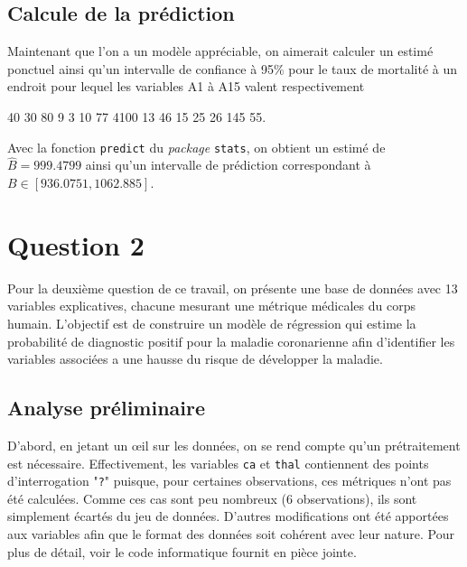 \documentclass{article}
\begin{document}
	\subsection{Calcule de la prédiction}
	Maintenant que l'on a un modèle appréciable, on aimerait calculer un estimé ponctuel ainsi qu’un intervalle de confiance à 95\% pour le taux de mortalité à un endroit pour lequel les variables A1 à A15 valent respectivement
	\begin{center}
		40 30 80 9 3 10 77 4100 13 46 15 25 26 145 55.
	\end{center}
	Avec la fonction \texttt{predict} du \textit{package} \texttt{stats}, on obtient un estimé de $\hat{B} = 999.4799$ ainsi qu'un intervalle de prédiction correspondant à  $B \in [936.0751, 1062.885]$.
	
\section{Question 2}
	Pour la deuxième question de ce travail, on présente une base de données avec 13 variables explicatives, chacune mesurant une métrique médicales du corps humain. L'objectif est de construire un modèle de régression qui estime la probabilité de diagnostic positif pour la maladie coronarienne afin d'identifier les variables associées a une hausse du risque de développer la maladie.
	
	\subsection{Analyse préliminaire}
	D'abord, en jetant un œil sur les données, on se rend compte qu'un prétraitement est nécessaire. Effectivement, les variables \texttt{ca} et \texttt{thal} contiennent des points d'interrogation "\texttt{?}" puisque, pour certaines observations, ces métriques n'ont pas été calculées. Comme ces cas sont peu nombreux (6 observations), ils sont simplement écartés du jeu de données. D'autres modifications ont été apportées aux variables afin que le format des données soit cohérent avec leur nature. Pour plus de détail, voir le code informatique fournit en pièce jointe.
	
	
\end{document}

